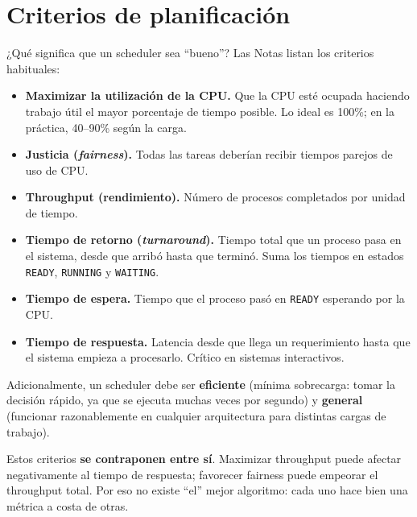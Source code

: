 \documentclass[11pt,a4paper]{article}
\begin{document}
\section{Criterios de planificación}

¿Qué significa que un scheduler sea ``bueno''? Las Notas listan los
criterios habituales:

\begin{itemize}[leftmargin=*]
    \item \textbf{Maximizar la utilización de la CPU.} Que la CPU esté
        ocupada haciendo trabajo útil el mayor porcentaje de tiempo
        posible. Lo ideal es 100\%; en la práctica, 40--90\% según la
        carga.
    \item \textbf{Justicia (\emph{fairness}).} Todas las tareas
        deberían recibir tiempos parejos de uso de CPU.
    \item \textbf{Throughput (rendimiento).} Número de procesos
        completados por unidad de tiempo.
    \item \textbf{Tiempo de retorno (\emph{turnaround}).} Tiempo total
        que un proceso pasa en el sistema, desde que arribó hasta que
        terminó. Suma los tiempos en estados \texttt{READY},
        \texttt{RUNNING} y \texttt{WAITING}.
    \item \textbf{Tiempo de espera.} Tiempo que el proceso pasó en
        \texttt{READY} esperando por la CPU.
    \item \textbf{Tiempo de respuesta.} Latencia desde que llega un
        requerimiento hasta que el sistema empieza a procesarlo.
        Crítico en sistemas interactivos.
\end{itemize}

Adicionalmente, un scheduler debe ser \textbf{eficiente} (mínima
sobrecarga: tomar la decisión rápido, ya que se ejecuta muchas veces
por segundo) y \textbf{general} (funcionar razonablemente en cualquier
arquitectura para distintas cargas de trabajo).

\begin{importante}
Estos criterios \textbf{se contraponen entre sí}. Maximizar throughput
puede afectar negativamente al tiempo de respuesta; favorecer fairness
puede empeorar el throughput total. Por eso no existe ``el'' mejor
algoritmo: cada uno hace bien una métrica a costa de otras.
\end{importante}
\end{document}

